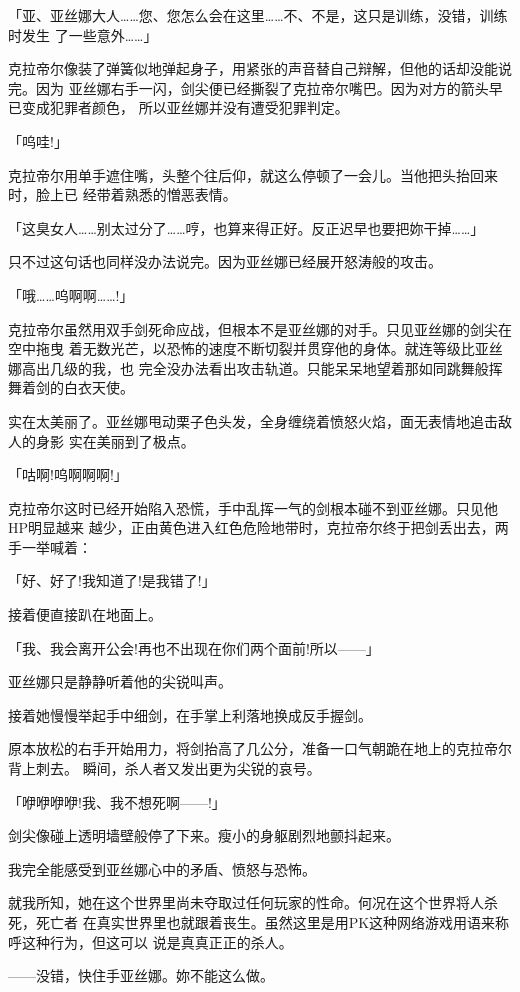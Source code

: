 \documentclass[11pt]{book}
\begin{document}
「亚、亚丝娜大人……您、您怎么会在这里……不、不是，这只是训练，没错，训练时发生
了一些意外……」

克拉帝尔像装了弹簧似地弹起身子，用紧张的声音替自己辩解，但他的话却没能说完。因为
亚丝娜右手一闪，剑尖便已经撕裂了克拉帝尔嘴巴。因为对方的箭头早已变成犯罪者颜色，
所以亚丝娜并没有遭受犯罪判定。

「呜哇!」

克拉帝尔用单手遮住嘴，头整个往后仰，就这么停顿了一会儿。当他把头抬回来时，脸上已
经带着熟悉的憎恶表情。

「这臭女人……别太过分了……哼，也算来得正好。反正迟早也要把妳干掉……」

只不过这句话也同样没办法说完。因为亚丝娜已经展开怒涛般的攻击。

「哦……呜啊啊……!」

克拉帝尔虽然用双手剑死命应战，但根本不是亚丝娜的对手。只见亚丝娜的剑尖在空中拖曳
着无数光芒，以恐怖的速度不断切裂并贯穿他的身体。就连等级比亚丝娜高出几级的我，也
完全没办法看出攻击轨道。只能呆呆地望着那如同跳舞般挥舞着剑的白衣天使。

实在太美丽了。亚丝娜甩动栗子色头发，全身缠绕着愤怒火焰，面无表情地追击敌人的身影
实在美丽到了极点。

「咕啊!呜啊啊啊!」

克拉帝尔这时已经开始陷入恐慌，手中乱挥一气的剑根本碰不到亚丝娜。只见他HP明显越来
越少，正由黄色进入红色危险地带时，克拉帝尔终于把剑丢出去，两手一举喊着：

「好、好了!我知道了!是我错了!」

接着便直接趴在地面上。

「我、我会离开公会!再也不出现在你们两个面前!所以——」

亚丝娜只是静静听着他的尖锐叫声。

接着她慢慢举起手中细剑，在手掌上利落地换成反手握剑。

原本放松的右手开始用力，将剑抬高了几公分，准备一口气朝跪在地上的克拉帝尔背上刺去。
瞬间，杀人者又发出更为尖锐的哀号。

「咿咿咿咿!我、我不想死啊——!」

剑尖像碰上透明墙壁般停了下来。瘦小的身躯剧烈地颤抖起来。

我完全能感受到亚丝娜心中的矛盾、愤怒与恐怖。

就我所知，她在这个世界里尚未夺取过任何玩家的性命。何况在这个世界将人杀死，死亡者
在真实世界里也就跟着丧生。虽然这里是用PK这种网络游戏用语来称呼这种行为，但这可以
说是真真正正的杀人。

——没错，快住手亚丝娜。妳不能这么做。
\end{document}
